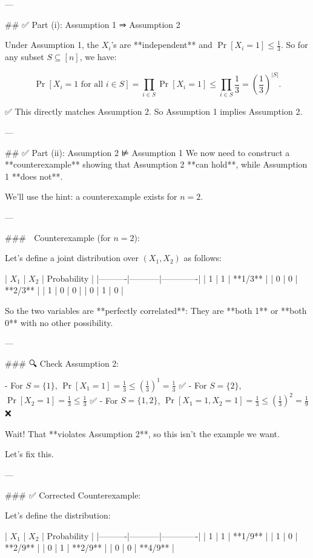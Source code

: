 ---

## ✅ Part (i): Assumption 1 ⇒ Assumption 2

Under Assumption 1, the \( X_i \)'s are **independent** and \( \Pr[X_i = 1] \le \frac{1}{3} \).  
So for any subset \( S \subseteq [n] \), we have:

\[
\Pr\left[X_i = 1 \text{ for all } i \in S\right] = \prod_{i \in S} \Pr[X_i = 1] \le \prod_{i \in S} \frac{1}{3} = \left(\frac{1}{3}\right)^{|S|}.
\]

✅ This directly matches Assumption 2.  
So Assumption 1 implies Assumption 2.

---

## ✅ Part (ii): Assumption 2 ⊭ Assumption 1  
We now need to construct a **counterexample** showing that Assumption 2 **can hold**, while Assumption 1 **does not**.

We'll use the hint: a counterexample exists for \( n = 2 \).

---

### 🔧 Counterexample (for \( n = 2 \)):

Let's define a joint distribution over \( (X_1, X_2) \) as follows:

| \( X_1 \) | \( X_2 \) | Probability |
|----------|-----------|-------------|
| 1        | 1         | **1/3**     |
| 0        | 0         | **2/3**     |
| 1        | 0         | 0           |
| 0        | 1         | 0           |

So the two variables are **perfectly correlated**:  
They are **both 1** or **both 0** with no other possibility.

---

### 🔍 Check Assumption 2:

- For \( S = \{1\} \), \( \Pr[X_1 = 1] = \frac{1}{3} \le \left(\frac{1}{3}\right)^1 = \frac{1}{3} \) ✅  
- For \( S = \{2\} \), \( \Pr[X_2 = 1] = \frac{1}{3} \le \frac{1}{3} \) ✅  
- For \( S = \{1, 2\} \), \( \Pr[X_1 = 1, X_2 = 1] = \frac{1}{3} \le \left(\frac{1}{3}\right)^2 = \frac{1}{9} \) ❌

Wait! That **violates Assumption 2**, so this isn't the example we want.

Let's fix this.

---

### ✅ Corrected Counterexample:

Let's define the distribution:

| \( X_1 \) | \( X_2 \) | Probability |
|----------|-----------|-------------|
| 1        | 1         | **1/9**     |
| 1        | 0         | **2/9**     |
| 0        | 1         | **2/9**     |
| 0        | 0         | **4/9**     |

